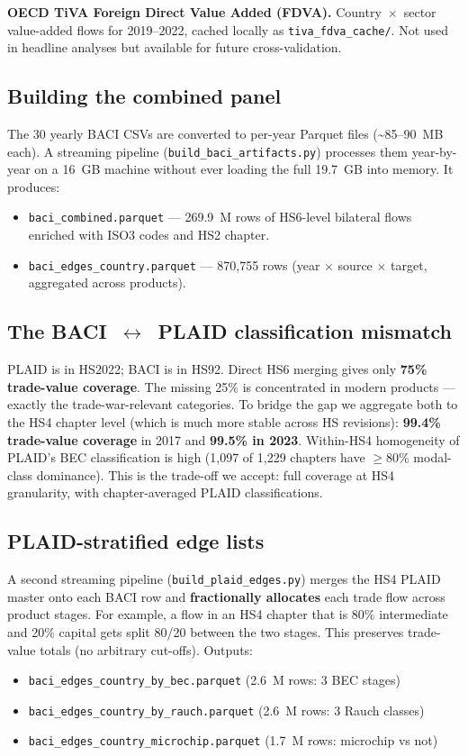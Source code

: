 \documentclass[11pt,a4paper]{article}
\begin{document}
\textbf{OECD TiVA Foreign Direct Value Added (FDVA).} Country~$\times$~sector
value-added flows for 2019--2022, cached locally as
\texttt{tiva\_fdva\_cache/}. Not used in headline analyses but available for
future cross-validation.

\subsection{Building the combined panel}

The 30 yearly BACI CSVs are converted to per-year Parquet files (\textasciitilde85--90~MB each).
A streaming pipeline (\texttt{build\_baci\_artifacts.py}) processes them
year-by-year on a 16~GB machine without ever loading the full 19.7~GB into
memory. It produces:
\begin{itemize}[leftmargin=*]
  \item \texttt{baci\_combined.parquet} — 269.9~M rows of HS6-level
        bilateral flows enriched with ISO3 codes and HS2 chapter.
  \item \texttt{baci\_edges\_country.parquet} — 870{,}755 rows
        (year $\times$ source $\times$ target, aggregated across products).
\end{itemize}

\subsection{The BACI~$\leftrightarrow$~PLAID classification mismatch}

PLAID is in HS2022; BACI is in HS92. Direct HS6 merging gives only
\textbf{75\% trade-value coverage}. The missing 25\% is concentrated in
modern products — exactly the trade-war-relevant categories. To bridge the
gap we aggregate both to the HS4 chapter level (which is much more stable
across HS revisions): \textbf{99.4\% trade-value coverage} in 2017 and
\textbf{99.5\% in 2023}. Within-HS4 homogeneity of PLAID's BEC classification
is high (1{,}097 of 1{,}229 chapters have $\geq$80\% modal-class dominance).
This is the trade-off we accept: full coverage at HS4 granularity, with
chapter-averaged PLAID classifications.

\subsection{PLAID-stratified edge lists}

A second streaming pipeline (\texttt{build\_plaid\_edges.py}) merges the HS4
PLAID master onto each BACI row and \textbf{fractionally allocates} each trade
flow across product stages. For example, a flow in an HS4 chapter that is
80\% intermediate and 20\% capital gets split 80/20 between the two stages.
This preserves trade-value totals (no arbitrary cut-offs). Outputs:
\begin{itemize}[leftmargin=*]
  \item \texttt{baci\_edges\_country\_by\_bec.parquet} (2.6~M rows: 3 BEC stages)
  \item \texttt{baci\_edges\_country\_by\_rauch.parquet} (2.6~M rows: 3 Rauch classes)
  \item \texttt{baci\_edges\_country\_microchip.parquet} (1.7~M rows: microchip vs not)
\end{itemize}
\end{document}
